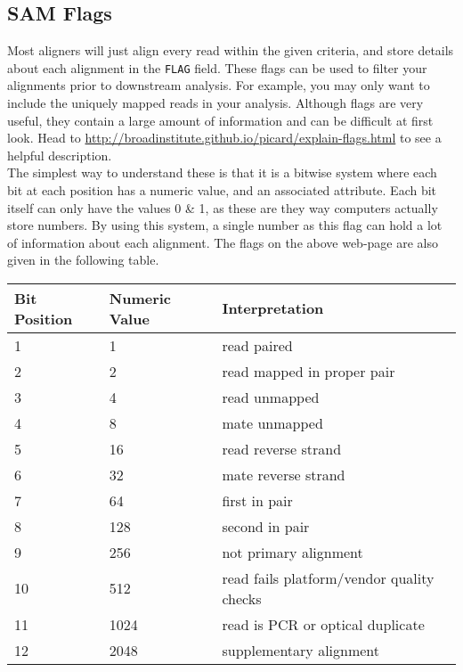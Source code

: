 \subsection{SAM Flags}
\begin{information}
Most aligners will just align every read within the given criteria, and store details about each alignment in the \texttt{FLAG} field.
These flags can be used to filter your alignments prior to downstream analysis.
For example, you may only want to include the uniquely mapped reads in your analysis.
Although flags are very useful, they contain a large amount of information and can be difficult at first look.
Head to \url{http://broadinstitute.github.io/picard/explain-flags.html} to see a helpful description.\\

The simplest way to understand these is that it is a bitwise system where each bit at each position has a numeric value, and an associated attribute.
Each bit itself can only have the values 0 \& 1, as these are they way computers actually store numbers.
By using this system, a single number as this flag can hold a lot of information about each alignment.
The flags on the above web-page are also given in the following table.\\

\begin{tabular}{lll}
	\hline
	Bit Position & Numeric Value & Interpretation \\
	\hline
 	1 & 1 & read paired\\
	2 & 2 & read mapped in proper pair\\
  	3 & 4 & read unmapped\\
	4 & 8 & mate unmapped\\
	5 & 16 & read reverse strand\\
	6 & 32 & mate reverse strand\\
	7 & 64 & first in pair\\
	8 & 128 & second in pair\\
	9 & 256 & not primary alignment\\
	10 & 512 & read fails platform/vendor quality checks\\
	11 & 1024 & read is PCR or optical duplicate\\
	12 & 2048 & supplementary alignment\\
 	\hline
\end{tabular}

\end{information}

